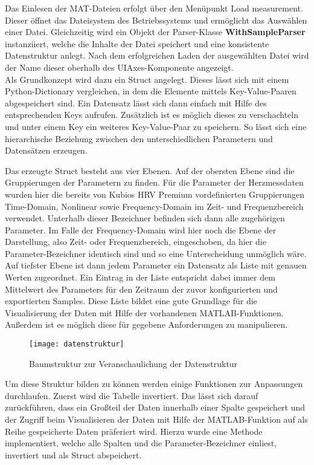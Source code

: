 Das Einlesen der MAT-Dateien erfolgt über den Menüpunkt \glqq Load measurement\grqq{}. Dieser öffnet das Dateisystem des Betriebssystems und ermöglicht das Auswählen einer Datei. Gleichzeitig wird ein Objekt der Parser-Klasse \textbf{WithSampleParser} instanziiert, welche die Inhalte der Datei speichert und eine konsistente Datenstruktur anlegt. Nach dem erfolgreichen Laden der ausgewählten Datei wird der Name dieser oberhalb des UIAxes-Komponente angezeigt.\\
Als Grundkonzept wird dazu ein Struct angelegt. Dieses lässt sich mit einem Python-Dictionary vergleichen, in dem die Elemente mittels Key-Value-Paaren abgespeichert sind. Ein Datensatz lässt sich dann einfach mit Hilfe des entsprechenden Keys aufrufen. Zusätzlich ist es möglich dieses zu verschachteln und unter einem Key ein weiteres Key-Value-Paar zu speichern. So lässt sich eine hierarchische Beziehung zwischen den unterschiedlichen Parametern und Datensätzen erzeugen.\cite{pythonDict}

Das erzeugte Struct besteht aus vier Ebenen. Auf der obersten Ebene sind die Gruppierungen der Parametern zu finden. Für die Parameter der Herzmessdaten wurden hier die bereits von Kubios HRV Premium vordefinierten Gruppierungen Time-Domain, Nonlinear sowie Frequency-Domain im Zeit- und Frequenzbereich verwendet. Unterhalb dieser Bezeichner befinden sich dann alle zugehörigen Parameter. Im Falle der Frequency-Domain wird hier noch die Ebene der Darstellung, also Zeit- oder Frequenzbereich, eingeschoben, da hier die Parameter-Bezeichner identisch sind und so eine Unterscheidung unmöglich wäre. Auf tiefster Ebene ist dann jedem Parameter ein Datensatz als Liste mit genauen Werten zugeordnet. Ein Eintrag in der Liste entspricht dabei immer dem Mittelwert des Parameters für den Zeitraum der zuvor konfigurierten und exportierten Samples. Diese Liste bildet eine gute Grundlage für die Visualisierung der Daten mit Hilfe der vorhandenen MATLAB-Funktionen. Außerdem ist es möglich diese für gegebene Anforderungen zu manipulieren.

\begin{figure}[H]
	\centering
	\texttt{[image: datenstruktur]}
	\caption{Baumstruktur zur Veranschaulichung der Datenstruktur}
	\label{fig:datenstruktur}
\end{figure}

Um diese Struktur bilden zu können werden einige Funktionen zur Anpassungen durchlaufen. Zuerst wird die Tabelle invertiert. Das lässt sich darauf zurückführen, dass ein Großteil der Daten innerhalb einer Spalte gespeichert und der Zugriff beim Visualisieren der Daten mit Hilfe der MATLAB-Funktion auf als Reihe gespeicherte Daten präferiert wird. Hierzu wurde eine Methode implementiert, welche alle Spalten und die Parameter-Bezeichner einliest, invertiert und als Struct abspeichert.

